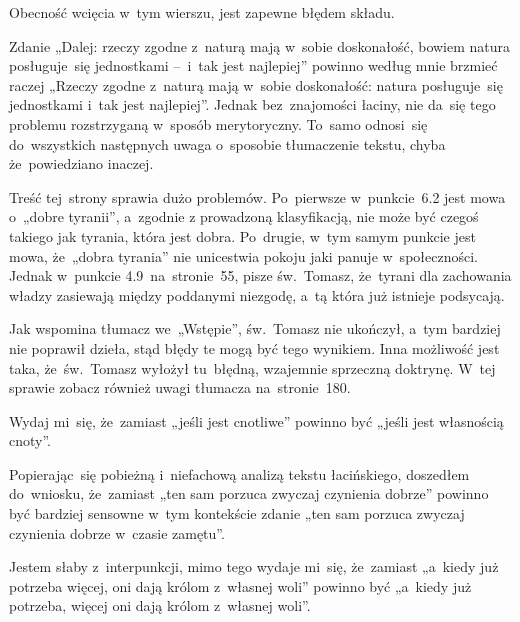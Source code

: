 \documentclass[a4paper,11pt]{article}
\begin{document}
\vspace{\spaceFour}


\start {} Obecność wcięcia w~tym wierszu, jest zapewne
błędem składu.

\vspace{\spaceFour}


\start {} Zdanie „Dalej: rzeczy zgodne z~naturą mają
w~sobie doskonałość, bowiem natura posługuje~się jednostkami --~i~tak
jest najlepiej” powinno według mnie brzmieć raczej „Rzeczy zgodne
z~naturą mają w~sobie doskonałość: natura posługuje~się jednostkami
i~tak jest najlepiej”. Jednak bez~znajomości łaciny, nie da~się tego
problemu rozstrzyganą w~sposób merytoryczny. To~samo odnosi~się
do~wszystkich następnych uwaga o~sposobie tłumaczenie tekstu, chyba
że~powiedziano inaczej.

\vspace{\spaceFour}


\start {} Treść tej~strony sprawia dużo problemów. Po~pierwsze
w~punkcie~6.2 jest mowa o~„dobre tyranii”, a~zgodnie z prowadzoną
klasyfikacją, nie może być czegoś takiego jak tyrania, która jest
dobra. Po~drugie, w~tym samym punkcie jest mowa, że~„dobra tyrania”
nie unicestwia pokoju jaki panuje w~społeczności. Jednak w~punkcie
4.9~na~stronie~55, pisze św.~Tomasz, że~tyrani dla zachowania władzy
zasiewają między poddanymi niezgodę, a~tą która już istnieje
podsycają.

Jak wspomina tłumacz we~„Wstępie”, św.~Tomasz nie ukończył, a~tym
bardziej nie poprawił dzieła, stąd błędy te mogą być tego wynikiem.
Inna możliwość jest taka, że~św.~Tomasz wyłożył tu~błędną, wzajemnie
sprzeczną doktrynę. W~tej sprawie zobacz również uwagi tłumacza
na~stronie~180.

\vspace{\spaceFour}


\start {} Wydaj mi~się, że~zamiast „jeśli jest cnotliwe”
powinno być „jeśli jest własnością cnoty”.

\vspace{\spaceFour}


\start {} Popierając~się pobieżną i~niefachową analizą
tekstu łacińskiego, doszedłem do~wniosku, że~zamiast „ten sam porzuca
zwyczaj czynienia dobrze” powinno być bardziej sensowne w~tym
kontekście zdanie „ten sam porzuca zwyczaj czynienia dobrze w~czasie
zamętu”.

\vspace{\spaceFour}


\start {} Jestem słaby z~interpunkcji, mimo tego wydaje
mi~się, że~zamiast „a~kiedy już potrzeba więcej, oni dają królom
z~własnej woli” powinno być „a~kiedy już potrzeba, więcej oni dają
królom z~własnej woli”.
\end{document}
